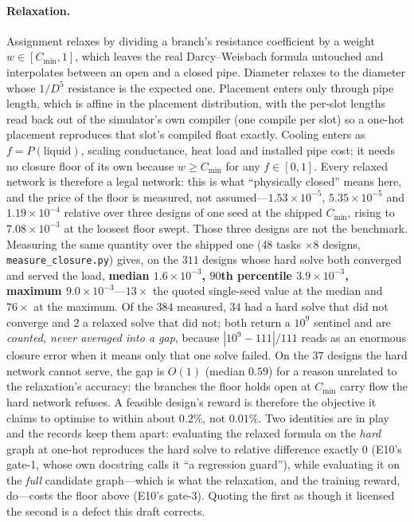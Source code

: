 \documentclass{article}
\begin{document}
\paragraph{Relaxation.}
Assignment relaxes by dividing a branch's resistance coefficient by a weight
$w \in [C_{\min}, 1]$, which leaves the real Darcy--Weisbach formula untouched
and interpolates between an open and a closed pipe.  Diameter relaxes to the
diameter whose $1/D^5$ resistance is the expected one.  Placement enters only
through pipe length, which is affine in the placement distribution, with the
per-slot lengths read back out of the simulator's own compiler (one compile per
slot) so a one-hot placement reproduces that slot's compiled float exactly.
Cooling enters as $f = P(\text{liquid})$, scaling conductance, heat load and
installed pipe cost; it needs no closure floor of its own because
$w \ge C_{\min}$ for any $f \in [0,1]$.  Every relaxed network is therefore a
legal network: this is what ``physically closed'' means here, and the price of
the floor is measured, not assumed---$1.53\times10^{-5}$, $5.35\times10^{-5}$ and
$1.19\times10^{-4}$ relative over three designs of one seed at the shipped $C_{\min}$,
rising to $7.08\times10^{-3}$ at the loosest floor swept.  Those three designs are not
the benchmark.  Measuring the same quantity over the shipped one ($48$ tasks $\times 8$
designs, \texttt{measure\_closure.py}) gives, on the $311$ designs whose hard solve
both converged and served the load, \textbf{median $1.6\times10^{-3}$, $90$th percentile
$3.9\times10^{-3}$, maximum $9.0\times10^{-3}$}---$13\times$ the quoted single-seed
value at the median and $76\times$ at the maximum.  Of the $384$ measured, $34$ had a
hard solve that did not converge and $2$ a relaxed solve that did not; both return a
$10^9$ sentinel and are \emph{counted, never averaged into a gap}, because
$|10^9 - 111|/111$ reads as an enormous closure error when it means only that one solve
failed.  On the $37$ designs the hard network cannot serve, the gap is $O(1)$ (median
$0.59$) for a reason unrelated to the relaxation's accuracy: the branches the floor
holds open at $C_{\min}$ carry flow the hard network refuses.  A feasible design's
reward is therefore the objective it claims to optimise to within about $0.2\%$, not
$0.01\%$.  Two identities are in play and the
records keep them apart: evaluating the relaxed formula on the \emph{hard} graph at
one-hot reproduces the hard solve to relative difference exactly $0$ (E10's gate-1,
whose own docstring calls it ``a regression guard''), while evaluating it on the
\emph{full} candidate graph---which is what the relaxation, and the training reward,
do---costs the floor above (E10's gate-3).  Quoting the first as though it licensed
the second is a defect this draft corrects.
\end{document}
